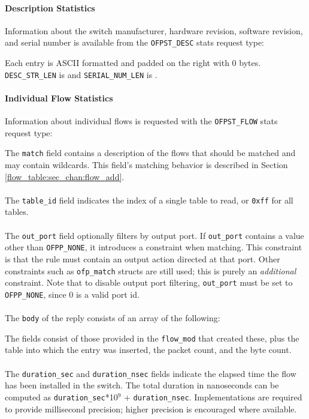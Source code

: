 

\paragraph{Description Statistics}
Information about the switch manufacturer, hardware revision, software revision, and serial number is available from the \verb|OFPST_DESC| stats request type:


Each entry is ASCII formatted and padded on the right with 0 bytes.  \verb|DESC_STR_LEN| is and \verb|SERIAL_NUM_LEN| is .  

\paragraph{Individual Flow Statistics}
Information about individual flows is requested with the \verb|OFPST_FLOW| stats request type:


The \verb|match| field contains a description of the flows that should be matched and may contain wildcards.  This field's matching behavior is described in Section \ref{flow_table:sec_chan:flow_add}.
\\\\
The \verb|table_id| field indicates the index of a single table to read, or \verb|0xff| for all tables.
\\\\
The \verb|out_port| field optionally filters by output port.  If \verb|out_port| contains a value other than \verb|OFPP_NONE|, it introduces a constraint when matching.  This constraint is that the rule must contain an output action directed at that port.  Other constraints such as \verb|ofp_match| structs are still used; this is purely an \emph{additional} constraint.  Note that to disable output port filtering, \verb|out_port| must be set to \verb|OFPP_NONE|, since 0 is a valid port id. 
\\\\
The \verb|body| of the reply consists of an array of the following:


The fields consist of those provided in the \verb|flow_mod| that created these, plus the table into which the entry was inserted, the packet count, and the byte count.
\\\\
The \verb|duration_sec| and \verb|duration_nsec| fields indicate the elapsed time the flow has been installed in the switch. The total duration in nanoseconds can be computed as \verb|duration_sec|*10$^{9}$ + \verb|duration_nsec|. Implementations are required to provide millisecond precision; higher precision is encouraged where available.

